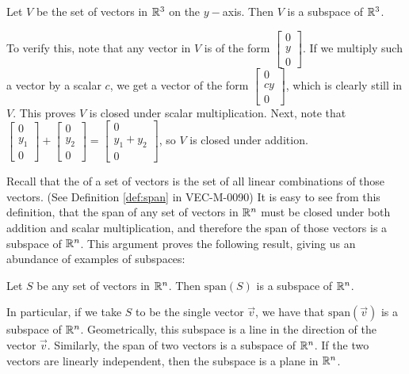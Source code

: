\documentclass{ximera}
\begin{document}
\begin{example} \label{y-axis_subspace}
Let $V$ be the set of vectors in $\mathbb{R}^3$ on the $y-$axis.  Then $V$ is a subspace of $\mathbb{R}^3$.  

\begin{explanation}
To verify this, note that any vector in $V$ is of the form $\begin{bmatrix}0\\y\\0 \end{bmatrix}$.  If we multiply such a vector by a scalar $c$, we get a vector of the form $\begin{bmatrix}0\\cy\\0 \end{bmatrix}$, which is clearly still in $V$.  This proves $V$ is closed under scalar multiplication.  Next, note that $\begin{bmatrix}0\\y_1\\0 \end{bmatrix} + \begin{bmatrix}0\\y_2\\0 \end{bmatrix}= \begin{bmatrix}0\\y_1 + y_2\\0\end{bmatrix}$, so $V$ is closed under addition.
\end{explanation}
\end{example}

Recall that the  of a set of vectors is the set of all linear combinations of those vectors. (See Definition \ref{def:span} in VEC-M-0090)  It is easy to see from this definition, that the span of any set of vectors in $\mathbb{R}^n$ must be closed under both addition and scalar multiplication, and therefore the span of those vectors is a subspace of $\mathbb{R}^n$.  This argument proves the following result, giving us an abundance of examples of subspaces:

\begin{theorem} \label{th:span_is_subspace}
Let $S$ be any set of vectors in $\mathbb{R}^n$.  Then $\mbox{span}(S)$ is a subspace of $\mathbb{R}^n$.
\end{theorem}

In particular, if we take $S$ to be the single vector $\vec{v}$, we have that $\text{span}(\vec{v})$ is a subspace of $\mathbb{R}^n$.  Geometrically, this subspace is a line in the direction of the vector $\vec{v}$.  Similarly, the span of two vectors is a subspace of $\mathbb{R}^n$.  If the two vectors are linearly independent, then the subspace is a plane in $\mathbb{R}^n$. 
\end{document}
